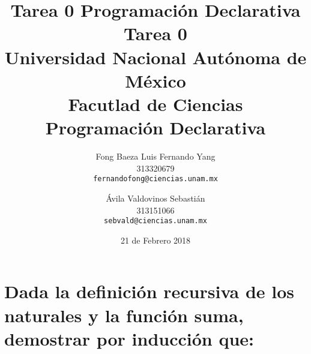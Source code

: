 \documentclass[11pt,letterpaper]{article}
\title{Tarea 0 Programación Declarativa}
\begin{document}
\title{\vspace{-1.5cm}
	Tarea 0\\
    \large Universidad Nacional Autónoma de México\\
    Facutlad de Ciencias\\
    Programación Declarativa\\
}
\author{
	Fong Baeza Luis Fernando Yang\\
    313320679\\
    \texttt{fernandofong@ciencias.unam.mx}
    \and
    Ávila Valdovinos Sebastián\\
    313151066\\
    \texttt{sebvald@ciencias.unam.mx}
    }
\date{21 de Febrero 2018}
\maketitle

\section {Dada la definición recursiva de los naturales y la función suma, demostrar por inducción que:}
\end{document}
